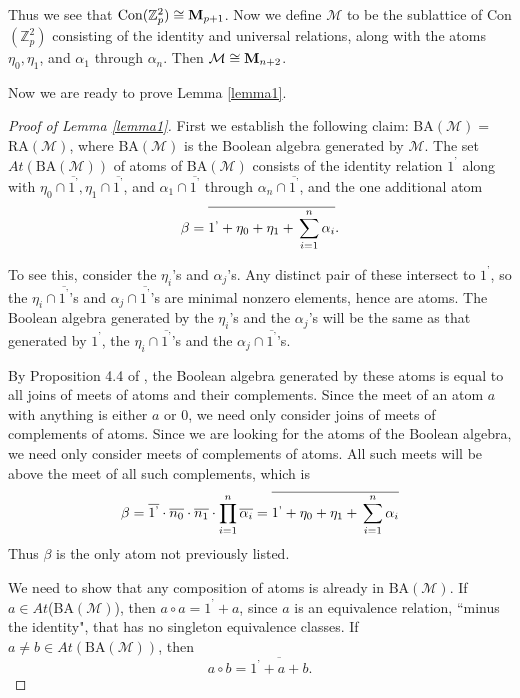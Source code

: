 \documentclass[12pt]{au}
\begin{document}
Thus we see that ${{\rm Con}}(\mathbb{Z}^2_p)\cong {{\mathbf{\uppercase{M}}}}_{p+1}$.  Now we
define $\mathcal{M}$ to be the sublattice of Con$(\mathbb{Z}_p^2)$ consisting of the identity
and universal relations, along with the atoms $\eta_0,\eta_1$, and
$\alpha_1$ through $\alpha_{n}$.  Then $\mathcal{M}\cong{{\mathbf{\uppercase{M}}}}_{n+2}$.

Now we are ready to prove Lemma \ref{lemma1}.

\begin{proof}[Proof  of Lemma \ref{lemma1}]
  First we establish the following claim: BA$(\mathcal{M})=$RA$(\mathcal{M})$,  where BA$(\mathcal{M})$ is the Boolean algebra generated by $\mathcal{M}$.  The set $At(\text{BA}(\mathcal{M}))$ of atoms of BA$(\mathcal{M})$ consists of the identity relation ${1^\text{'}}$ along with $\eta_0\cap \overline{1^\text{'}},\eta_1 \cap \overline{1^\text{'}}$, and $\alpha_1\cap \overline{1^\text{'}}$ through $\alpha_{n}\cap \overline{1^\text{'}}$, and the one additional atom $$\beta=\overline{{1^\text{'}}+\eta_0+\eta_1+{\displaystyle}\sum^{n}_{i=1}\alpha_i}.$$

  To see this, consider the $\eta _i$'s and $\alpha_j$'s.  Any distinct pair of these intersect to ${1^\text{'}}$, so the $\eta_i\cap\overline{1^\text{'}}$'s and $\alpha_j\cap\overline{1^\text{'}}$'s are minimal nonzero elements, hence are atoms.  The Boolean algebra generated by the $\eta_i$'s and the $\alpha_j$'s will be the same as that generated by ${1^\text{'}}$, the $\eta_i\cap\overline{1^\text{'}}$'s and the $\alpha_j\cap\overline{1^\text{'}}$'s.

  By Proposition 4.4 of \cite{SK}, the Boolean algebra generated by these atoms is equal to all joins of meets of atoms and their complements.  Since the meet of an atom $a$ with anything is either $a$ or 0, we need only consider joins of meets of complements of atoms.  Since we are looking for the atoms of the Boolean algebra, we need only consider meets of complements of atoms.  All such meets will be above the meet of all such complements, which is
  $$\beta=\overline{1^\text{'}}\cdot\overline{n_0}\cdot\overline{n_1}\cdot \prod_{i=1}^{n}\overline{\alpha_i}=\overline{{1^\text{'}}+\eta_0+\eta_1+{\displaystyle}\sum^{n}_{i=1}\alpha_i}$$
  Thus $\beta$ is the only atom not previously listed.

  We need to show that any composition of atoms is already in BA$(\mathcal{M})$.  If $a\in At$(BA$(\mathcal{M})$), then $a\circ a={1^\text{'}}+a$, since $a$ is an equivalence relation,  ``minus the identity", that has no singleton equivalence classes.  If $a\neq b\in At(\text{BA}(\mathcal{M}))$, then $$a\circ
  b=\overline{{1^\text{'}}+a+b}.$$


\end{proof}
\end{document}
